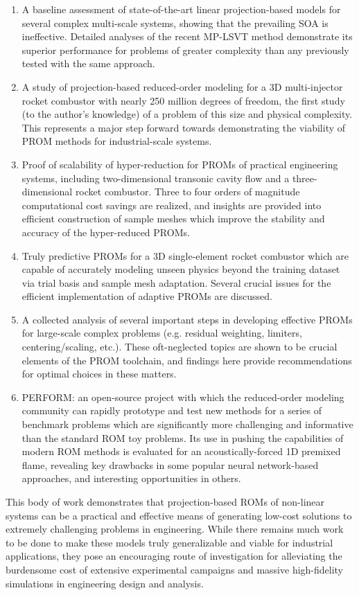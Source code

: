 \begin{enumerate}
    \item A baseline assessment of state-of-the-art linear projection-based models for several complex multi-scale systems, showing that the prevailing SOA is ineffective. Detailed analyses of the recent MP-LSVT method demonstrate its superior performance for problems of greater complexity than any previously tested with the same approach.
    \item A study of projection-based reduced-order modeling for a 3D multi-injector rocket combustor with nearly 250 million degrees of freedom, the first study (to the author's knowledge) of a problem of this size and physical complexity. This represents a major step forward towards demonstrating the viability of PROM methods for industrial-scale systems.
    \item Proof of scalability of hyper-reduction for PROMs of practical engineering systems, including two-dimensional transonic cavity flow and a three-dimensional rocket combustor. Three to four orders of magnitude computational cost savings are realized, and insights are provided into efficient construction of sample meshes which improve the stability and accuracy of the hyper-reduced PROMs.
    \item Truly predictive PROMs for a 3D single-element rocket combustor which are capable of accurately modeling unseen physics beyond the training dataset via trial basis and sample mesh adaptation. Several crucial issues for the efficient implementation of adaptive PROMs are discussed. 
    \item A collected analysis of several important steps in developing effective PROMs for large-scale complex problems (e.g. residual weighting, limiters, centering/scaling, etc.). These oft-neglected topics are shown to be crucial elements of the PROM toolchain, and findings here provide recommendations for optimal choices in these matters. 
    \item PERFORM: an open-source project with which the reduced-order modeling community can rapidly prototype and test new methods for a series of benchmark problems which are significantly more challenging and informative than the standard ROM toy problems. Its use in pushing the capabilities of modern ROM methods is evaluated for an acoustically-forced 1D premixed flame, revealing key drawbacks in some popular neural network-based approaches, and interesting opportunities in others.
\end{enumerate}

This body of work demonstrates that projection-based ROMs of non-linear systems can be a practical and effective means of generating low-cost solutions to extremely challenging problems in engineering. While there remains much work to be done to make these models truly generalizable and viable for industrial applications, they pose an encouraging route of investigation for alleviating the burdensome cost of extensive experimental campaigns and massive high-fidelity simulations in engineering design and analysis.
